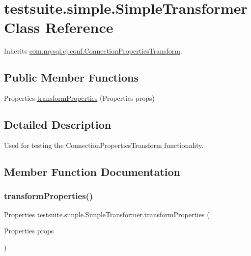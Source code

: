 \hypertarget{classtestsuite_1_1simple_1_1_simple_transformer}{}\section{testsuite.\+simple.\+Simple\+Transformer Class Reference}
\label{classtestsuite_1_1simple_1_1_simple_transformer}


Inherits \mbox{\hyperlink{interfacecom_1_1mysql_1_1cj_1_1conf_1_1_connection_properties_transform}{com.\+mysql.\+cj.\+conf.\+Connection\+Properties\+Transform}}.

\subsection*{Public Member Functions}
\begin{DoxyCompactItemize}
\item 
Properties \mbox{\hyperlink{classtestsuite_1_1simple_1_1_simple_transformer_aadfc91d352f3a7b94257f30b319cb258}{transform\+Properties}} (Properties props)
\end{DoxyCompactItemize}


\subsection{Detailed Description}
Used for testing the Connection\+Properties\+Transform functionality. 

\subsection{Member Function Documentation}
\mbox{\label{classtestsuite_1_1simple_1_1_simple_transformer_aadfc91d352f3a7b94257f30b319cb258}} 
\subsubsection{\texorpdfstring{transform\+Properties()}{transformProperties()}}
{\footnotesize\ttfamily Properties testsuite.\+simple.\+Simple\+Transformer.\+transform\+Properties (\begin{DoxyParamCaption}\item[{Properties}]{props }\end{DoxyParamCaption})}

